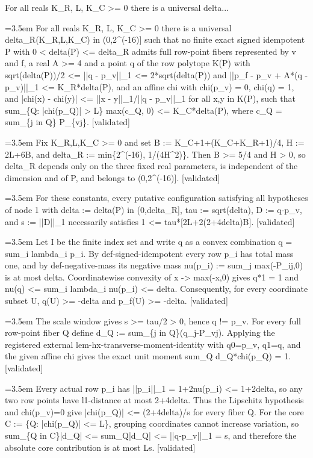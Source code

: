 \documentclass{article}
\newcommand{\step}[1]{\par\noindent\hangindent=3.5em\hangafter=1%
  \makebox[3.5em][l]{\textbf{#1.}}}
\newcommand{\steptag}[1]{\hfill{\small\textsf{[#1]}}}
\begin{document}
\begin{proofbox}{For all reals K\_R, L, K\_C >= 0 there is a universal delta...}
\step{1} For all reals K\_R, L, K\_C >= 0 there is a universal delta\_R(K\_R,L,K\_C) in (0,2\textasciicircum{}(-16)] such that no finite exact signed idempotent P with 0 < delta(P) <= delta\_R admits full row-point fibers represented by v and f, a real A >= 4 and a point q of the row polytope K(P) with sqrt(delta(P))/2 <= ||q - p\_v||\_1 <= 2*sqrt(delta(P)) and ||p\_f - p\_v + A*(q - p\_v)||\_1 <= K\_R*delta(P), and an affine chi with chi(p\_v) = 0, chi(q) = 1, and |chi(x) - chi(y)| <= ||x - y||\_1/||q - p\_v||\_1 for all x,y in K(P), such that sum\_\{Q: |chi(p\_Q)| > L\} max(c\_Q, 0) <= K\_C*delta(P), where c\_Q = sum\_\{j in Q\} P\_\{vj\}. \steptag{validated} \\[6pt]
\step{1.1} Fix K\_R,L,K\_C >= 0 and set B := K\_C+1+(K\_C+K\_R+1)/4, H := 2L+6B, and delta\_R := min\{2\textasciicircum{}(-16), 1/(4H\textasciicircum{}2)\}. Then B >= 5/4 and H > 0, so delta\_R depends only on the three fixed real parameters, is independent of the dimension and of P, and belongs to (0,2\textasciicircum{}(-16)]. \steptag{validated} \\[4pt]
\step{1.2} For these constants, every putative configuration satisfying all hypotheses of node 1 with delta := delta(P) in (0,delta\_R], tau := sqrt(delta), D := q-p\_v, and s := ||D||\_1 necessarily satisfies 1 <= tau*[2L+2(2+4delta)B]. \steptag{validated} \\[6pt]
\step{1.2.1} Let I be the finite index set and write q as a convex combination q = sum\_i lambda\_i p\_i. By def-signed-idempotent every row p\_i has total mass one, and by def-negative-mass its negative mass nu(p\_i) := sum\_j max(-P\_ij,0) is at most delta. Coordinatewise convexity of x -> max(-x,0) gives q*1 = 1 and nu(q) <= sum\_i lambda\_i nu(p\_i) <= delta. Consequently, for every coordinate subset U, q(U) >= -delta and p\_f(U) >= -delta. \steptag{validated} \\[4pt]
\step{1.2.2} The scale window gives s >= tau/2 > 0, hence q != p\_v. For every full row-point fiber Q define d\_Q := sum\_\{j in Q\}(q\_j-P\_vj). Applying the registered external lem-hx-transverse-moment-identity with q0=p\_v, q1=q, and the given affine chi gives the exact unit moment sum\_Q d\_Q*chi(p\_Q) = 1. \steptag{validated} \\[4pt]
\step{1.2.3} Every actual row p\_i has ||p\_i||\_1 = 1+2nu(p\_i) <= 1+2delta, so any two row points have l1-distance at most 2+4delta. Thus the Lipschitz hypothesis and chi(p\_v)=0 give |chi(p\_Q)| <= (2+4delta)/s for every fiber Q. For the core C := \{Q: |chi(p\_Q)| <= L\}, grouping coordinates cannot increase variation, so sum\_\{Q in C\}|d\_Q| <= sum\_Q|d\_Q| <= ||q-p\_v||\_1 = s, and therefore the absolute core contribution is at most Ls. \steptag{validated} \\[4pt]

\end{proofbox}
\end{document}

